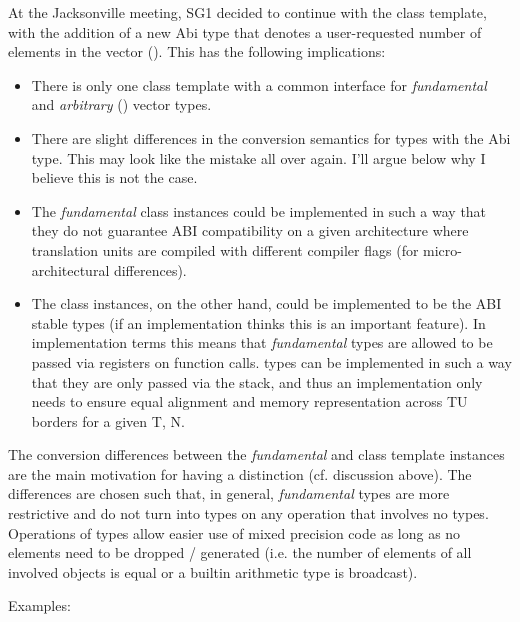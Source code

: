 At the Jacksonville meeting, SG1 decided to continue with the \datapar[<T, Abi>] class template, with the addition of a new Abi type that denotes a user-requested number of elements in the vector (\fixedsizeN).
This has the following implications:
\begin{itemize}
  \item There is only one class template with a common interface for \textit{fundamental} and \textit{arbitrary} (\fixedsize) vector types.
  \item There are slight differences in the conversion semantics for \datapar types with the \fixedsize Abi type.
    This may look like the  mistake all over again.
    I'll argue below why I believe this is not the case.
  \item The \textit{fundamental} class instances could be implemented in such a way that they do not guarantee ABI compatibility on a given architecture where translation units are compiled with different compiler flags (for micro-architectural differences).
  \item The \fixedsize class instances, on the other hand, could be implemented to be the ABI stable types (if an implementation thinks this is an important feature).
    In implementation terms this means that \textit{fundamental} types are allowed to be passed via registers on function calls.
    \fixedsize types can be implemented in such a way that they are only passed via the stack, and thus an implementation only needs to ensure equal alignment and memory representation across TU borders for a given \type T, \code N.
\end{itemize}

The conversion differences between the \textit{fundamental} and \fixedsize class template instances are the main motivation for having a distinction (cf. discussion above).
The differences are chosen such that, in general, \textit{fundamental} types are more restrictive and do not turn into \fixedsize types on any operation that involves no \fixedsize types.
Operations of \fixedsize types allow easier use of mixed precision code as long as no elements need to be dropped / generated (i.e. the number of elements of all involved \datapar objects is equal or a builtin arithmetic type is broadcast).

Examples:

